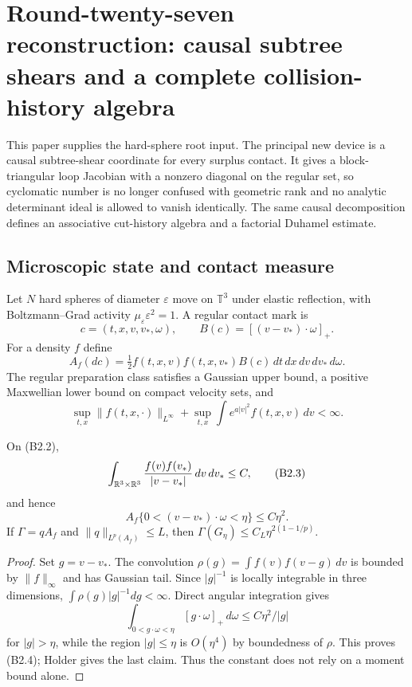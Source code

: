
\section{Round-twenty-seven reconstruction: causal subtree shears and a complete collision-history algebra}
\label{sec:r27-b2}

This paper supplies the hard-sphere root input.  The principal new device is a
causal subtree-shear coordinate for every surplus contact.  It gives a
block-triangular loop Jacobian with a nonzero diagonal on the regular set, so
cyclomatic number is no longer confused with geometric rank and no analytic
determinant ideal is allowed to vanish identically.  The same causal
decomposition defines an associative cut-history algebra and a factorial
Duhamel estimate.

\subsection{Microscopic state and contact measure}

Let $N$ hard spheres of diameter $\varepsilon$ move on $\mathbb T^3$ under
elastic reflection, with Boltzmann--Grad activity
$\mu_\varepsilon\varepsilon^2=1$.  A regular contact mark is
\[
 c=(t,x,v,v_*,\omega),\qquad
 B(c)=[(v-v_*)\cdot\omega]_+.
\]
For a density $f$ define
\[
 A_f(dc)=\tfrac12 f(t,x,v)f(t,x,v_*)B(c)
 \,dt\,dx\,dv\,dv_*\,d\omega.                             \tag{B2.1}
\]
The regular preparation class satisfies a Gaussian upper bound, a positive
Maxwellian lower bound on compact velocity sets, and
\[
 \sup_{t,x}\|f(t,x,\cdot)\|_{L^\infty}
 +\sup_{t,x}\int e^{a|v|^2}f(t,x,v)\,dv<\infty.            \tag{B2.2}
\]

\begin{lemma}
\label{lem:r27-b2-relative}
On (B2.2),
\[
 \int_{\mathbb R^3\times\mathbb R^3}
 {f(v)f(v_*)\over|v-v_*|}\,dv\,dv_*\le C,                 \tag{B2.3}
\]
and hence
\[
 A_f\{0<(v-v_*)\cdot\omega<\eta\}\le C\eta^2.             \tag{B2.4}
\]
If $\Gamma=qA_f$ and $\|q\|_{L^p(A_f)}\le L$, then
$\Gamma(G_\eta)\le C_L\eta^{2(1-1/p)}$.
\end{lemma}

\begin{proof}
Set $g=v-v_*$.  The convolution
$\rho(g)=\int f(v)f(v-g)\,dv$ is bounded by
$\|f\|_\infty$ and has Gaussian tail.  Since $|g|^{-1}$ is locally integrable
in three dimensions, $\int\rho(g)|g|^{-1}dg<\infty$.  Direct angular
integration gives
\[
 \int_{0<g\cdot\omega<\eta}[g\cdot\omega]_+\,d\omega
 \le C\eta^2/|g|
\]
for $|g|>\eta$, while the region $|g|\le\eta$ is $O(\eta^4)$ by boundedness of
$\rho$.  This proves (B2.4); Holder gives the last claim.  Thus the constant
does not rely on a moment bound alone.
\end{proof}

